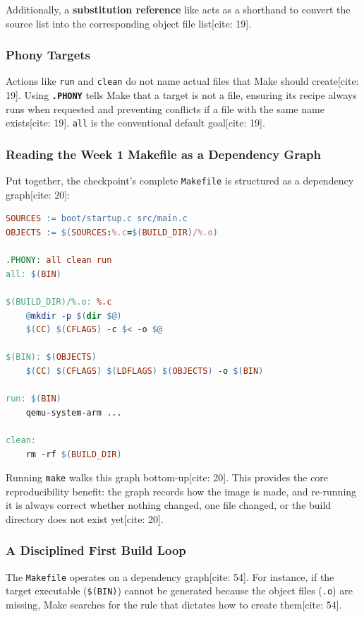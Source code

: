 Additionally, a \textbf{substitution reference} like \texttt{} acts as a shorthand to convert the source list into the corresponding object file list[cite: 19].
\subsubsection{Phony Targets}
Actions like \texttt{run} and \texttt{clean} do not name actual files that Make should create[cite: 19]. Using \textbf{\texttt{.PHONY}} tells Make that a target is not a file, ensuring its recipe always runs when requested and preventing conflicts if a file with the same name exists[cite: 19]. \texttt{all} is the conventional default goal[cite: 19].

\subsubsection{Reading the Week 1 Makefile as a Dependency Graph}
Put together, the checkpoint's complete \texttt{Makefile} is structured as a dependency graph[cite: 20]:

\begin{lstlisting}[language=make]
SOURCES := boot/startup.c src/main.c
OBJECTS := $(SOURCES:%.c=$(BUILD_DIR)/%.o)

.PHONY: all clean run
all: $(BIN)

$(BUILD_DIR)/%.o: %.c
	@mkdir -p $(dir $@)
	$(CC) $(CFLAGS) -c $< -o $@

$(BIN): $(OBJECTS)
	$(CC) $(CFLAGS) $(LDFLAGS) $(OBJECTS) -o $(BIN)

run: $(BIN)
	qemu-system-arm ...

clean:
	rm -rf $(BUILD_DIR)
\end{lstlisting}

Running \texttt{make} walks this graph bottom-up[cite: 20]. This provides the core reproducibility benefit: the graph records how the image is made, and re-running it is always correct whether nothing changed, one file changed, or the build directory does not exist yet[cite: 20].

\subsubsection{A Disciplined First Build Loop}
The \texttt{Makefile} operates on a dependency graph[cite: 54]. For instance, if the target executable (\texttt{\$(BIN)}) cannot be generated because the object files (\texttt{.o}) are missing, Make searches for the rule that dictates how to create them[cite: 54]. 

